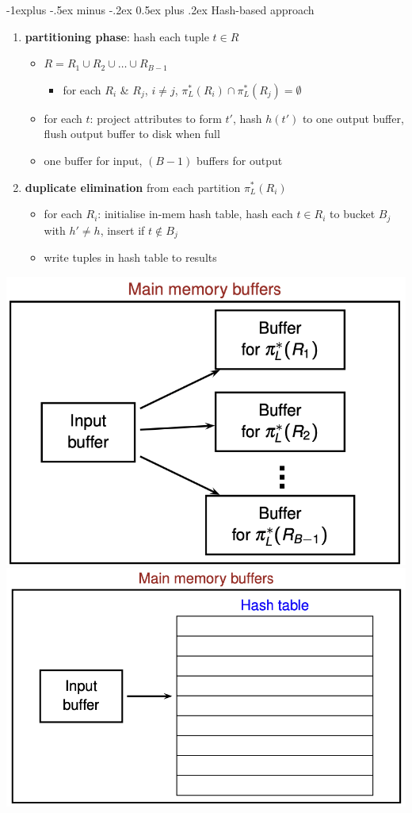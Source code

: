 \documentclass[10pt, landscape]{article}
\makeatletter
\renewcommand{\subsection}{\@startsection{subsection}{2}{0mm}%
  {-1explus -.5ex minus -.2ex}%
  {0.5ex plus .2ex}%
{\normalfont\normalsize\bfseries}}
\makeatother
\begin{document}
\begin{multicols*}{4}
  \subsection{Hash-based approach}

  \begin{enumerate}
    \item \textbf{partitioning phase}: hash each tuple $t \in R$ 
      \begin{itemize}
        \item $R = R_1 \cup R_2 \cup \dots \cup R_{B-1}$
          \begin{itemize}
            \item for each $R_i$ \& $R_j$, $i \neq j$, $\pi_L^*(R_i) \cap \pi_L^*(R_j) = \emptyset$
          \end{itemize}
        \item for each $t$: project attributes to form $t'$, hash $h(t')$ to one output buffer, flush output buffer to disk when full
        \item one buffer for input, $(B-1)$ buffers for output
      \end{itemize}
    \item \textbf{duplicate elimination} from each partition $\pi^*_L(R_i)$
      \begin{itemize}
        \item for each $R_i$: initialise in-mem hash table, hash each $t \in R_i$ to bucket $B_j$ with $h' \neq h$, insert if $t \not\in B_j$
        \item write tuples in hash table to results
      \end{itemize}
  \end{enumerate}
  \includegraphics[width=0.4\linewidth]{cs3223-projection-hash-1.png} 
  \includegraphics[width=0.5\linewidth]{cs3223-projection-hash-2.png} 


\end{multicols*}
\end{document}
